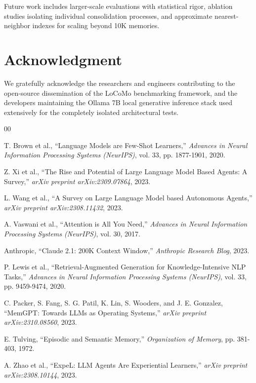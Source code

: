 \documentclass[conference]{IEEEtran}
\begin{document}
Future work includes larger-scale evaluations with statistical rigor, ablation studies isolating individual consolidation processes, and approximate nearest-neighbor indexes for scaling beyond 10K memories.

\section*{Acknowledgment}

We gratefully acknowledge the researchers and engineers contributing to the open-source dissemination of the LoCoMo benchmarking framework, and the developers maintaining the Ollama 7B local generative inference stack used extensively for the completely isolated architectural tests.

\begin{thebibliography}{00}

 T. Brown et al., ``Language Models are Few-Shot Learners,'' \textit{Advances in Neural Information Processing Systems (NeurIPS)}, vol. 33, pp. 1877-1901, 2020.

 Z. Xi et al., ``The Rise and Potential of Large Language Model Based Agents: A Survey,'' \textit{arXiv preprint arXiv:2309.07864}, 2023.

 L. Wang et al., ``A Survey on Large Language Model based Autonomous Agents,'' \textit{arXiv preprint arXiv:2308.11432}, 2023.

 A. Vaswani et al., ``Attention is All You Need,'' \textit{Advances in Neural Information Processing Systems (NeurIPS)}, vol. 30, 2017.

 Anthropic, ``Claude 2.1: 200K Context Window,'' \textit{Anthropic Research Blog}, 2023.

 P. Lewis et al., ``Retrieval-Augmented Generation for Knowledge-Intensive NLP Tasks,'' \textit{Advances in Neural Information Processing Systems (NeurIPS)}, vol. 33, pp. 9459-9474, 2020.

 C. Packer, S. Fang, S. G. Patil, K. Lin, S. Wooders, and J. E. Gonzalez, ``MemGPT: Towards LLMs as Operating Systems,'' \textit{arXiv preprint arXiv:2310.08560}, 2023.

 E. Tulving, ``Episodic and Semantic Memory,'' \textit{Organization of Memory}, pp. 381-403, 1972.

 A. Zhao et al., ``ExpeL: LLM Agents Are Experiential Learners,'' \textit{arXiv preprint arXiv:2308.10144}, 2023.


\end{thebibliography}
\end{document}
